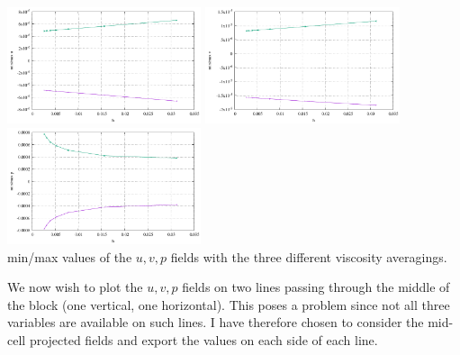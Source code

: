 \begin{center}
\includegraphics[width=5.7cm]{python_codes/fieldstone_158/results/exp5/stats_u}
\includegraphics[width=5.7cm]{python_codes/fieldstone_158/results/exp5/stats_v}
\includegraphics[width=5.7cm]{python_codes/fieldstone_158/results/exp5/stats_p}\\
{\captionfont min/max values of the $u,v,p$ fields with the three different 
viscosity averagings.}
\end{center}

We now wish to plot the $u,v,p$ fields on two lines passing through the middle 
of the block (one vertical, one horizontal). This poses a problem since not all 
three variables are available on such lines. I have therefore chosen to consider the 
mid-cell projected fields and export the values on each side of each line.

\newpage


